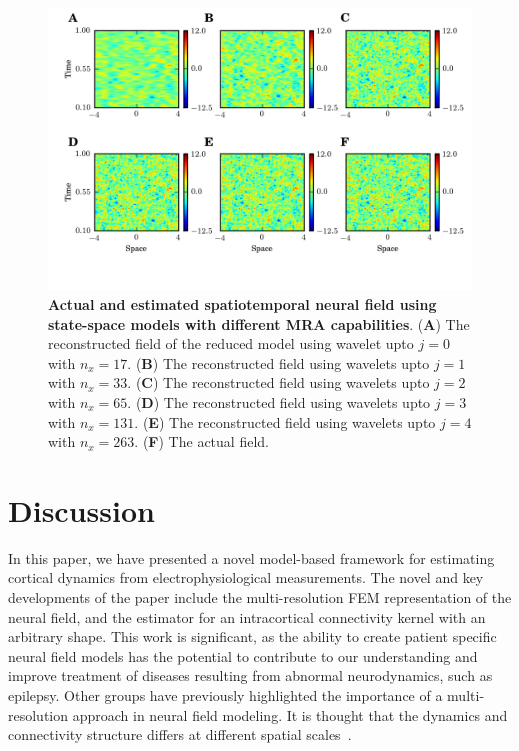 \documentclass[review,authoryear,3p]{elsarticle}
\newcommand{\dean}[1]{\textcolor{green}{#1}}
\begin{document}
\begin{figure}[t]
	\centering
		\includegraphics[scale=1]{./Graph/fig12.png}
	\caption{{\bf Actual and estimated spatiotemporal neural field using state-space models with different MRA capabilities}. (\textbf{A}) The reconstructed field of the reduced model using wavelet upto $j=0$ with $n_x=17$. (\textbf{B}) The reconstructed field using wavelets upto $j=1$ with $n_x=33$. (\textbf{C}) The reconstructed field  using wavelets upto $j=2$ with $n_x=65$. (\textbf{D}) The reconstructed field using wavelets upto $j=3$ with $n_x=131$. (\textbf{E}) The reconstructed field using wavelets upto $j=4$ with $n_x=263$. (\textbf{F}) The actual field.} 
\label{fig:FieldEstimation}
\end{figure}
\section{Discussion}
In this paper, we have presented a novel model-based framework for estimating cortical dynamics from electrophysiological measurements. The novel and key developments of the paper include the multi-resolution FEM representation of the neural field, and the estimator for an intracortical connectivity kernel with an arbitrary shape. This work is significant, as the ability to create patient specific neural field models has the potential to contribute to our understanding and improve treatment of diseases resulting from abnormal neurodynamics, such as epilepsy. Other groups have previously highlighted the importance of a multi-resolution approach in neural field modeling. It is thought that the dynamics and connectivity structure differs at different spatial scales~\citep{Qubbaj2009,Breakspear2005,Schultze-Kraft2010}. %
\end{document}
